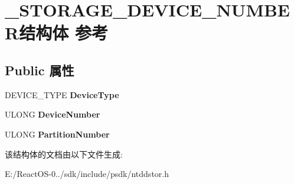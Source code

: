 \hypertarget{struct___s_t_o_r_a_g_e___d_e_v_i_c_e___n_u_m_b_e_r}{}\section{\+\_\+\+S\+T\+O\+R\+A\+G\+E\+\_\+\+D\+E\+V\+I\+C\+E\+\_\+\+N\+U\+M\+B\+E\+R结构体 参考}
\label{struct___s_t_o_r_a_g_e___d_e_v_i_c_e___n_u_m_b_e_r}
\subsection*{Public 属性}
\begin{DoxyCompactItemize}
\item 
\mbox{\label{struct___s_t_o_r_a_g_e___d_e_v_i_c_e___n_u_m_b_e_r_a0c376985f045cab700e161a863b640c3}} 
D\+E\+V\+I\+C\+E\+\_\+\+T\+Y\+PE {\bfseries Device\+Type}
\item 
\mbox{\label{struct___s_t_o_r_a_g_e___d_e_v_i_c_e___n_u_m_b_e_r_a56ef54f1b6229f3ba68bd694950b2d08}} 
U\+L\+O\+NG {\bfseries Device\+Number}
\item 
\mbox{\label{struct___s_t_o_r_a_g_e___d_e_v_i_c_e___n_u_m_b_e_r_ab214acfd2733cf803e62907fffe03e7c}} 
U\+L\+O\+NG {\bfseries Partition\+Number}
\end{DoxyCompactItemize}


该结构体的文档由以下文件生成\+:\begin{DoxyCompactItemize}
\item 
E\+:/\+React\+O\+S-\/0../sdk/include/psdk/ntddstor.\+h\end{DoxyCompactItemize}
